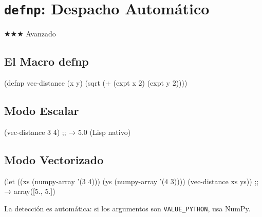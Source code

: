 \chapter{\texttt{defnp}: Despacho Automático}
\label{chap:defnp}
{\huge$\bigstar$}{\huge$\bigstar$}{\huge$\bigstar$} Avanzado

\section{El Macro defnp}
\begin{lispcode}
(defnp vec-distance (x y) (sqrt (+ (expt x 2) (expt y 2))))
\end{lispcode}

\section{Modo Escalar}
\begin{lispcode}
(vec-distance 3 4)  ;; → 5.0 (Lisp nativo)
\end{lispcode}

\section{Modo Vectorizado}
\begin{lispcode}
(let ((xs (numpy-array '(3 4))) (ys (numpy-array '(4 3))))
  (vec-distance xs ys))  ;; → array([5., 5.])
\end{lispcode}

La detección es automática: si los argumentos son \texttt{VALUE\_PYTHON}, usa NumPy.

